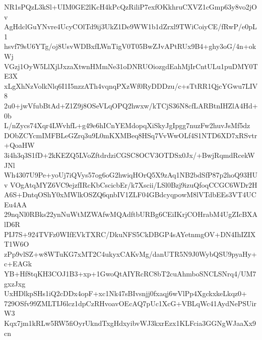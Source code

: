 NR1sPQzL3kSl+UIM0GE2lKcH4kPcQzRiliP7exfOKkhruCXVZ1cGmp63y8vo2jOv
AgHdclGuYNvre4UcyCOlTd9ij3UkZ1De9WW1b1dZrxl9TWiCoiyCE/fRwP/e0pL1
hsvf79sU6YTg/oj8UsvWDBxfLWnTigV0T05BwZJvAPtRUx9B4+ghy3oG/4n+okWj
VGzj1OyW5LlXjlJxzaXtwnHMmNe31oDNRUOiozgdEahMjIrCntULu1puDMY0TE3X
xLgXhNzVolkNlq6I1I5nzzATh4vqnqPXzWf0RyDDDzu/c+sTtRR1QjcYGwu7LIV8
2u0+jwVfubBtAd+Z1Z9j8OSeVLqOPQ2hwxw/kTCjS36N8cfLARBtnIHZlA4Hd+0b
L/nZycs74Xqr4LWvhfL+g49e6hICnYEMdopqXiSkyJgIpgg7nuzFw2huvJsMf5dz
DObZCYcmIMFBLeGZrq3u9L0mKXMBeq8HSq7VvWwOLf4S1NTD6XD7xRSvtr+QoaHW
3i4h3q3S1fD+2kKEZQ5LVoZftdrdziCGSC8OCV3OTDSx0Jx/+BwjRqmdRcekWJNl
Wh4307U9Pe+yoUj7iQVys57og6oG2hwiqHOrQ5X9zAq1NB2bdSfP87p2hoQ93HUv
VOgAtqMYZ6VC9ejzfIRcKbCscicbEr/k7Xscii/LSl0Bzj9izuQfoqCCGC6WDr2H
A6S+DntqOShY0xMWlkOSZQ6qnbIV1ZLF04GBdcyqpowM8lVTdbEEs3VT4UCEu4AA
29nqNl0RBks22ynNuWtMZWAfwMQAdftbURBg6CEiIKrjCOHrabM4UgZIcBXAlD6R
PIJ7S+924TVFz0WIfEVkTXRC/DkuNFS5CkDBGP4sAYetnmgOV+DN4IhIZIXT1W6O
zPp9vlSZ+w8WTuKG7xMT2C4ukyxCAKvMg/danUTR5N9J0WybQSU9pyaHy+c+EAGk
YB+Hf8tqKH3COJ1B3+xp+1GwoQtAIYRcRC8bT2cuAhmboSNCLSNrq4/UM7gxzJxg
UxHDlkpSHs1iQ2cDDx4opF+xc1Nk47sBIvsnjj0fxaqj6wVlPp4XgckxkeLkqz0+
729OSfv99ZMLTIJ6lcz1dpCzRHvoavOEcAQ7pUc1XcG+VBLqWc41AydNePSUirW3
Kqx7jm1kRLw5RW5fiOyrUkndTxgHdxyibvWJ3kxrEzx1KLFcia3GGNgWJaaXx9cn
